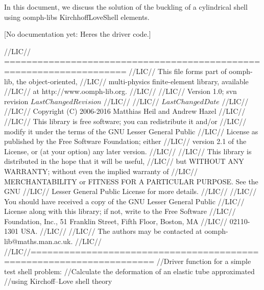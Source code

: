 In this document, we discuss the solution of the buckling of a cylindrical shell using {\ttfamily oomph-\/lib\textquotesingle{}s} Kirchhoff\+Love\+Shell elements.

\mbox{[}No documentation yet\+: Here\textquotesingle{}s the driver code.\mbox{]}


\begin{DoxyCodeInclude}
\textcolor{comment}{//LIC// ====================================================================}
\textcolor{comment}{//LIC// This file forms part of oomph-lib, the object-oriented, }
\textcolor{comment}{//LIC// multi-physics finite-element library, available }
\textcolor{comment}{//LIC// at http://www.oomph-lib.org.}
\textcolor{comment}{//LIC// }
\textcolor{comment}{//LIC//    Version 1.0; svn revision $LastChangedRevision$}
\textcolor{comment}{//LIC//}
\textcolor{comment}{//LIC// $LastChangedDate$}
\textcolor{comment}{//LIC// }
\textcolor{comment}{//LIC// Copyright (C) 2006-2016 Matthias Heil and Andrew Hazel}
\textcolor{comment}{//LIC// }
\textcolor{comment}{//LIC// This library is free software; you can redistribute it and/or}
\textcolor{comment}{//LIC// modify it under the terms of the GNU Lesser General Public}
\textcolor{comment}{//LIC// License as published by the Free Software Foundation; either}
\textcolor{comment}{//LIC// version 2.1 of the License, or (at your option) any later version.}
\textcolor{comment}{//LIC// }
\textcolor{comment}{//LIC// This library is distributed in the hope that it will be useful,}
\textcolor{comment}{//LIC// but WITHOUT ANY WARRANTY; without even the implied warranty of}
\textcolor{comment}{//LIC// MERCHANTABILITY or FITNESS FOR A PARTICULAR PURPOSE.  See the GNU}
\textcolor{comment}{//LIC// Lesser General Public License for more details.}
\textcolor{comment}{//LIC// }
\textcolor{comment}{//LIC// You should have received a copy of the GNU Lesser General Public}
\textcolor{comment}{//LIC// License along with this library; if not, write to the Free Software}
\textcolor{comment}{//LIC// Foundation, Inc., 51 Franklin Street, Fifth Floor, Boston, MA}
\textcolor{comment}{//LIC// 02110-1301  USA.}
\textcolor{comment}{//LIC// }
\textcolor{comment}{//LIC// The authors may be contacted at oomph-lib@maths.man.ac.uk.}
\textcolor{comment}{//LIC// }
\textcolor{comment}{//LIC//====================================================================}
\textcolor{comment}{//Driver function for a simple test shell problem:}
\textcolor{comment}{//Calculate the deformation of an elastic tube approximated}
\textcolor{comment}{//using Kirchoff--Love shell theory}


\end{DoxyCodeInclude}
